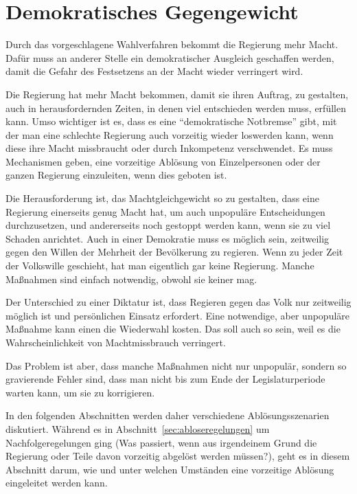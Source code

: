 \section{Demokratisches Gegengewicht} \label{sec:demokratisches-gegengewicht}
Durch das vorgeschlagene Wahlverfahren bekommt die Regierung mehr Macht.
Dafür muss an anderer Stelle ein demokratischer Ausgleich geschaffen werden, damit die Gefahr des Festsetzens an der Macht wieder verringert wird.

Die Regierung hat mehr Macht bekommen, damit sie ihren Auftrag, zu gestalten, auch in herausfordernden Zeiten, in denen viel entschieden werden muss, erfüllen kann.
Umso wichtiger ist es, dass es eine \enquote{demokratische Notbremse} gibt, mit der man eine schlechte Regierung auch vorzeitig wieder loswerden kann, wenn diese ihre Macht missbraucht oder durch Inkompetenz verschwendet.
Es muss Mechanismen geben, eine vorzeitige Ablösung von Einzelpersonen oder der ganzen Regierung einzuleiten, wenn dies geboten ist.

Die Herausforderung ist, das Machtgleichgewicht so zu gestalten, dass eine Regierung einerseits genug Macht hat, um auch unpopuläre Entscheidungen durchzusetzen, und andererseits noch gestoppt werden kann, wenn sie zu viel Schaden anrichtet.
Auch in einer Demokratie muss es möglich sein, zeitweilig gegen den Willen der Mehrheit der Bevölkerung zu regieren.
Wenn zu jeder Zeit der Volkswille geschieht, hat man eigentlich gar keine Regierung.
Manche Maßnahmen sind einfach notwendig, obwohl sie keiner mag.

Der Unterschied zu einer Diktatur ist, dass Regieren gegen das Volk nur zeitweilig möglich ist und persönlichen Einsatz erfordert.
Eine notwendige, aber unpopuläre Maßnahme kann einen die Wiederwahl kosten.
Das soll auch so sein, weil es die Wahrscheinlichkeit von Machtmissbrauch verringert.

Das Problem ist aber, dass manche Maßnahmen nicht nur unpopulär, sondern so gravierende Fehler sind, dass man nicht bis zum Ende der Legislaturperiode warten kann, um sie zu korrigieren.

In den folgenden Abschnitten werden daher verschiedene Ablösungsszenarien diskutiert.
Während es in Abschnitt~\ref{sec:abloseregelungen} um Nachfolgeregelungen ging (Was passiert, wenn aus irgendeinem Grund die Regierung oder Teile davon vorzeitig abgelöst werden müssen?),
geht es in diesem Abschnitt darum, wie und unter welchen Umständen eine vorzeitige Ablösung eingeleitet werden kann.

